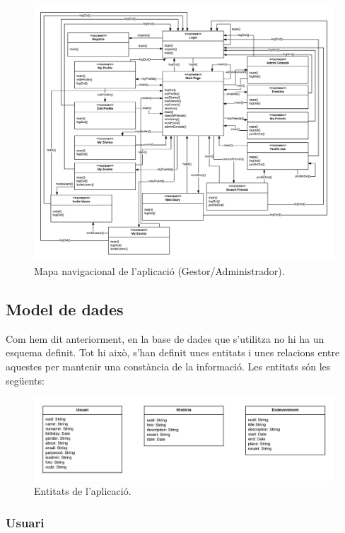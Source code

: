 \documentclass[11pt,catalan,listoffigures,listoftables]{tfgetsinf}
\begin{document}
\begin{figure}[H]
\includegraphics[width=15cm]{images/image10}
\centering
\caption[Figura 4.5]{Mapa navigacional de l'aplicació (Gestor/Administrador).}
\centering
\end{figure}

\subsection{Model de dades}

Com hem dit anteriorment, en la base de dades que s'utilitza no hi ha un esquema definit. Tot hi això, s'han definit unes entitats i unes relacions entre aquestes per mantenir una constància de la informació. Les entitats són les següents:

\begin{figure}[h]
\includegraphics[width=15cm]{images/image6}
\centering
\caption[Figura 4.6]{Entitats de l'aplicació.}
\centering
\end{figure}

\subsubsection{Usuari}
\end{document}
